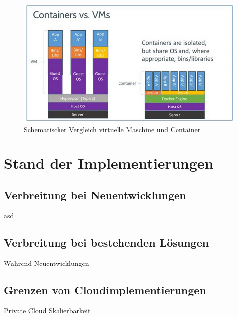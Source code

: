 \begin{figure}
	\centering
	\includegraphics[width=0.8\linewidth]{images/docker-vm-container}
	\caption{Schematischer Vergleich virtuelle Maschine und Container}
	\label{fig:docker}
\end{figure}

\section{Stand der Implementierungen}
\label{sec_implementations}

\subsection{Verbreitung bei Neuentwicklungen}
asd

\subsection{Verbreitung bei bestehenden Lösungen}
Während Neuentwicklungen 

\subsection{Grenzen von Cloudimplementierungen}
Private Cloud Skalierbarkeit